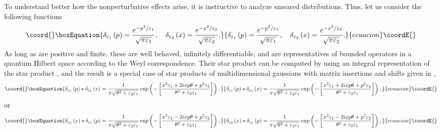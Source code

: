 \documentclass[a4paper,12pt]{article}
\begin{document}
To understand better how the nonperturbative effects arise, it is
instructive to analyze smeared distributions. Thus, let us consider the
following \coordHE{} functions
\begin{equation}\coord{}\boxEquation{
\delta _{\varepsilon _{1}}\left( p\right) =\frac{e^{-p^{2}/\varepsilon _{1}}
}{\sqrt{\pi \varepsilon _{1}}},\quad \delta _{\varepsilon _{2}}\left(
x\right) =\frac{e^{-x^{2}/\varepsilon _{2}}}{\sqrt{\pi \varepsilon _{2}}}.
}{
\delta _{\varepsilon _{1}}\left( p\right) =\frac{e^{-p^{2}/\varepsilon _{1}}
}{\sqrt{\pi \varepsilon _{1}}},\quad \delta _{\varepsilon _{2}}\left(
x\right) =\frac{e^{-x^{2}/\varepsilon _{2}}}{\sqrt{\pi \varepsilon _{2}}}.
}{ecuacion}\coordE{}\end{equation}
As long as \coordHE{}  \coordHE{} are positive and finite,
these are well behaved, infinitely differentiable, and are representatives
of bounded operators in a quantum Hilbert space according to the Weyl
correspondence. Their star product can be computed by using an integral
representation of the star product \cite{baker}\cite{curtright}, and the
result is a special case of star products of multidimensional gaussians with
matrix insertions and shifts given in \cite{witmoy},
\begin{equation}\coord{}\boxEquation{
\delta _{\varepsilon _{1}}\left( p\right) \star \delta _{\varepsilon
_{2}}\left( x\right) =\frac{1}{\pi \sqrt{\theta ^{2}+\varepsilon
_{2}\varepsilon _{1}}}\exp \left( -\left[ \frac{x^{2}\varepsilon
_{1}+2ixp\theta +p^{2}\varepsilon _{2}}{\theta ^{2}+\varepsilon
_{2}\varepsilon _{1}}\right] \right) ,
}{
\delta _{\varepsilon _{1}}\left( p\right) \star \delta _{\varepsilon
_{2}}\left( x\right) =\frac{1}{\pi \sqrt{\theta ^{2}+\varepsilon
_{2}\varepsilon _{1}}}\exp \left( -\left[ \frac{x^{2}\varepsilon
_{1}+2ixp\theta +p^{2}\varepsilon _{2}}{\theta ^{2}+\varepsilon
_{2}\varepsilon _{1}}\right] \right) ,
}{ecuacion}\coordE{}\end{equation}
or
\begin{equation}\coord{}\boxEquation{
\delta _{\varepsilon _{2}}\left( x\right) \star \delta _{\varepsilon
_{1}}\left( p\right) =\frac{1}{\pi \sqrt{\theta ^{2}+\varepsilon
_{2}\varepsilon _{1}}}\exp \left( -\left[ \frac{x^{2}\varepsilon
_{1}-2ixp\theta +p^{2}\varepsilon _{2}}{\theta ^{2}+\varepsilon
_{2}\varepsilon _{1}}\right] \right) ,
}{
\delta _{\varepsilon _{2}}\left( x\right) \star \delta _{\varepsilon
_{1}}\left( p\right) =\frac{1}{\pi \sqrt{\theta ^{2}+\varepsilon
_{2}\varepsilon _{1}}}\exp \left( -\left[ \frac{x^{2}\varepsilon
_{1}-2ixp\theta +p^{2}\varepsilon _{2}}{\theta ^{2}+\varepsilon
_{2}\varepsilon _{1}}\right] \right) ,
}{ecuacion}\coordE{}\end{equation}
\end{document}
